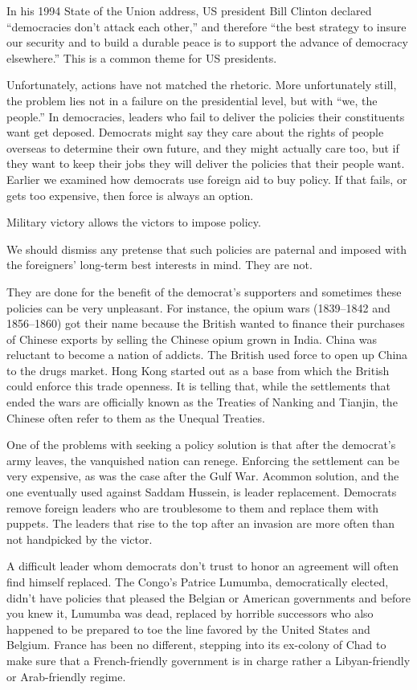\documentclass[10pt]{article}
\begin{document}
{\large In his 1994 State of the Union address, US president Bill Clinton
declared ``democracies don't attack each other,'' and therefore ``the best
strategy to insure our security and to build a durable peace is to support the
advance of democracy elsewhere.'' This is a common theme for US presidents.}

{\large Unfortunately, actions have not matched the rhetoric. More unfortunately
still, the problem lies not in a failure on the presidential level, but with
``we, the people.'' In democracies, leaders who fail to deliver the policies
their constituents want get deposed. Democrats might say they care about the
rights of people overseas to determine their own future, and they might actually
care too, but if they want to keep their jobs they will deliver the policies that
their people want. Earlier we examined how democrats use foreign aid to buy
policy. If that fails, or gets too expensive, then force is always an option.}

{\large Military victory allows the victors to impose policy.}

{\large We should dismiss any pretense that such policies are paternal and
imposed with the foreigners' long-term best interests in mind. They are not.}

{\large They are done for the benefit of the democrat's supporters and sometimes
these policies can be very unpleasant. For instance, the opium wars (1839--1842
and 1856--1860) got their name because the British wanted to finance their
purchases of Chinese exports by selling the Chinese opium grown in India. China
was reluctant to become a nation of addicts. The British used force to open up
China to the drugs market. Hong Kong started out as a base from which the British
could enforce this trade openness. It is telling that, while the settlements that
ended the wars are officially known as the Treaties of Nanking and Tianjin, the
Chinese often refer to them as the Unequal Treaties.}

{\large One of the problems with seeking a policy solution is that after the
democrat's army leaves, the vanquished nation can renege. Enforcing the
settlement can be very expensive, as was the case after the Gulf War. Acommon
solution, and the one eventually used against Saddam Hussein, is leader
replacement. Democrats remove foreign leaders who are troublesome to them and
replace them with puppets. The leaders that rise to the top after an invasion are
more often than not handpicked by the victor.}

{\large A difficult leader whom democrats don't trust to honor an agreement will
often find himself replaced. The Congo's Patrice Lumumba, democratically elected,
didn't have policies that pleased the Belgian or American governments and before
you knew it, Lumumba was dead, replaced by horrible successors who also happened
to be prepared to toe the line favored by the United States and Belgium. France
has been no different, stepping into its ex-colony of Chad to make sure that a
French-friendly government is in charge rather a Libyan-friendly or Arab-friendly
regime.}
\end{document}
